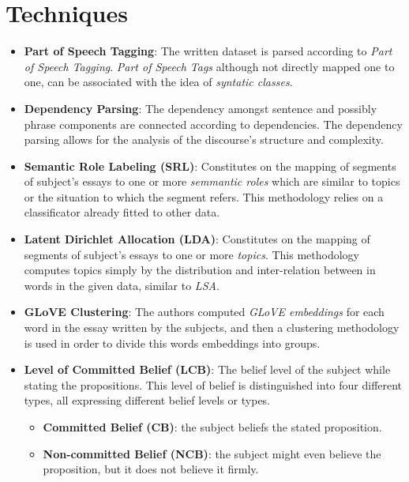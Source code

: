 \documentclass{Paper_Summary}
\begin{document}
\section{Techniques}
    \begin{itemize}
        \item \textbf{Part of Speech Tagging}: The written dataset is parsed according to \emph{Part of Speech Tagging}. \emph{Part of Speech Tags} although not directly mapped one to one, can be associated with the idea of \emph{syntatic classes}. 
        \item \textbf{Dependency Parsing}: The dependency amongst sentence and possibly phrase components are connected according to dependencies. The dependency parsing allows for the analysis of the discourse's structure and complexity.
        \item \textbf{Semantic Role Labeling (SRL)}: Constitutes on the mapping of segments of subject's essays to one or more \emph{semmantic roles} which are similar to topics or the situation to which the segment refers. This methodology relies on a classificator already fitted to other data.
        \item \textbf{Latent Dirichlet Allocation (LDA)}: Constitutes on the mapping of segments of subject's essays to one or more \emph{topics}. This methodology computes topics simply by the distribution and inter-relation between in words in the given data, similar to \emph{LSA}.
        \item \textbf{GLoVE Clustering}: The authors computed \emph{GLoVE embeddings} for each word in the essay written by the subjects, and then a clustering methodology is used in order to divide this words embeddings into groups.
        \item \textbf{Level of Committed Belief (LCB)}: The belief level of the subject while stating the propositions. This level of belief is distinguished into four different types, all expressing different belief levels or types.
        \begin{itemize}
            \item \textbf{Committed Belief (CB)}: the subject beliefs the stated proposition.
            \item \textbf{Non-committed Belief (NCB)}: the subject might even believe the proposition, but it does not believe it firmly.

\end{itemize}
\end{itemize}
\end{document}
